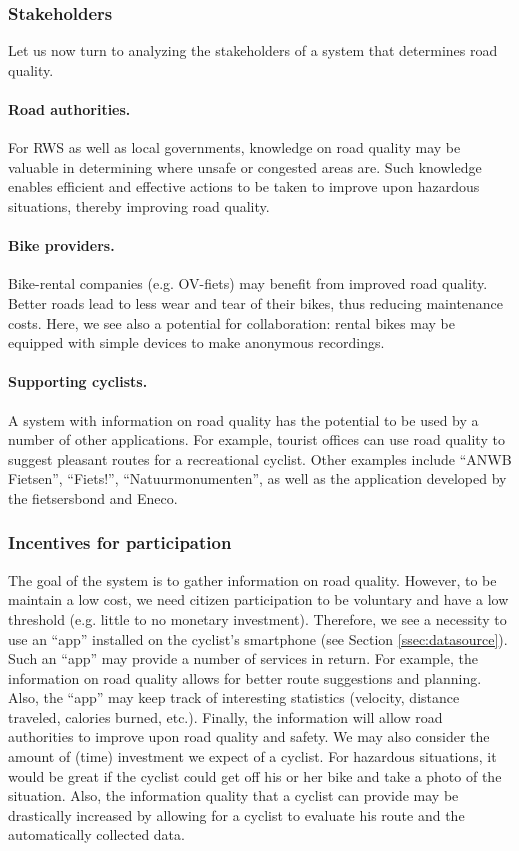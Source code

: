 \documentclass[a4paper,11pt]{article}
\begin{document}
\subsubsection{Stakeholders}

Let us now turn to analyzing the stakeholders of a system that determines road quality.

\paragraph{Road authorities.}
For RWS as well as local governments, knowledge on road quality may be valuable in determining 
where unsafe or congested areas are. Such knowledge enables efficient and effective actions 
to be taken to improve upon hazardous situations, thereby improving road quality.

\paragraph{Bike providers.}
Bike-rental companies (e.g. OV-fiets) may benefit from improved road quality.
Better roads lead to less wear and tear of their bikes, thus reducing maintenance costs. 
Here, we see also a potential for collaboration: rental bikes may be equipped with 
simple devices to make anonymous recordings.

\paragraph{Supporting cyclists.}
A system with information on road quality has the potential to be used by 
a number of other applications. For example, tourist offices can use road 
quality to suggest pleasant routes for a recreational cyclist. 
Other examples include ``ANWB Fietsen'', ``Fiets!'', ``Natuurmonumenten'', as well as the
application developed by the fietsersbond and Eneco.

\subsubsection{Incentives for participation}

The goal of the system is to gather information on road quality. 
However, to be maintain a low cost, we need citizen participation to be 
voluntary and have a low threshold (e.g. little to no monetary investment). 
Therefore, we see a necessity to use an ``app'' installed on the cyclist's 
smartphone (see Section \ref{ssec:datasource}). Such an ``app'' 
may provide a number of services in return. For example, 
the information on road quality allows for better route suggestions and planning. 
Also, the ``app'' may keep track of interesting statistics 
(velocity, distance traveled, calories burned, etc.). Finally, 
the information will allow road authorities to improve upon road quality and safety.
We may also consider the amount of (time) investment we expect of a cyclist. 
For hazardous situations, it would be great if the cyclist could get off his or 
her bike and take a photo of the situation. Also, the information quality that a cyclist 
can provide may be drastically increased by allowing for a cyclist to evaluate his route 
and the automatically collected data.
\end{document}
